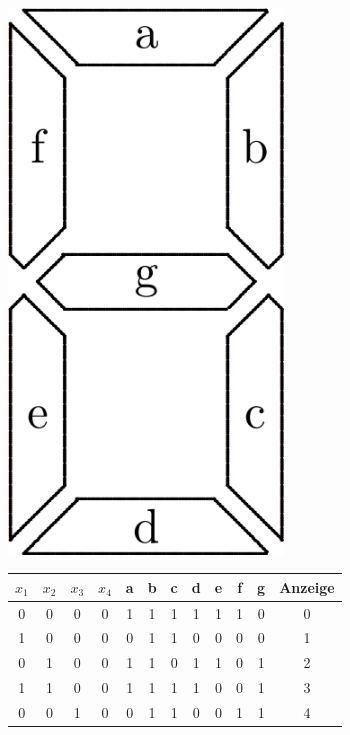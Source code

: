 \documentclass[numbers=noenddot,12pt,a4paper]{scrartcl}
\begin{document}
\begin{figure}[H]
\begin{minipage}[htbp]{0.28\textwidth}
\centering
\includegraphics[width=0.65\textwidth]{sieben.png}
\caption{Kennzeichung} \label{img:sieben}
\end{minipage}
\hfill
\begin{minipage}[htbp]{0.68\textwidth}
\begin{table}[H]
\centering
\begin{tabular}{cccc||ccccccc||c}
$x_1$ & $x_2$ & $x_3$ & $x_4$ & a & b & c & d & e & f & g & Anzeige \\ \hline \hline
0 & 0 & 0 & 0 & 1 & 1 & 1 & 1 & 1 & 1 & 0 & 0 \\ 
1 & 0 & 0 & 0 & 0 & 1 & 1 & 0 & 0 & 0 & 0 & 1 \\
0 & 1 & 0 & 0 & 1 & 1 & 0 & 1 & 1 & 0 & 1 & 2 \\
1 & 1 & 0 & 0 & 1 & 1 & 1 & 1 & 0 & 0 & 1 & 3 \\
0 & 0 & 1 & 0 & 0 & 1 & 1 & 0 & 0 & 1 & 1 & 4 \\

\end{tabular}
\end{table}
\end{minipage}
\end{figure}
\end{document}
